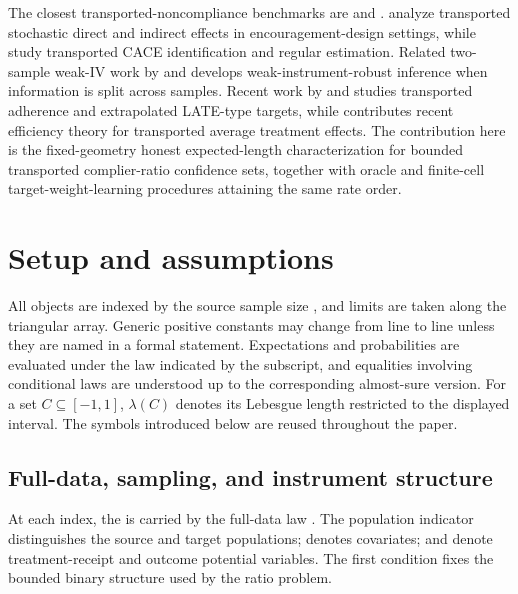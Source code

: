 \documentclass[11pt]{article}
\begin{document}
The closest transported-noncompliance benchmarks are \citet{RudolphVanderLaan2017} and \citet{ChenHuang2025}. \citet{RudolphVanderLaan2017} analyze transported stochastic direct and indirect effects in encouragement-design settings, while \citet{ChenHuang2025} study transported CACE identification and regular estimation. Related two-sample weak-IV work by \citet{ChoiGuShen2018} and \citet{ChoiShen2019} develops weak-instrument-robust inference when information is split across samples. Recent work by \citet{Ross2026} and \citet{Ren2025} studies transported adherence and extrapolated LATE-type targets, while \citet{Rudolph2025} contributes recent efficiency theory for transported average treatment effects. The contribution here is the fixed-geometry honest expected-length characterization for bounded transported complier-ratio confidence sets, together with oracle and finite-cell target-weight-learning procedures attaining the same rate order.


\section{Setup and assumptions}

All objects are indexed by the source sample size , and limits are taken along the triangular array. Generic positive constants may change from line to line unless they are named in a formal statement. Expectations and probabilities are evaluated under the law indicated by the subscript, and equalities involving conditional laws are understood up to the corresponding almost-sure version. For a set \(C\subseteq[-1,1]\), \(\lambda(C)\) denotes its Lebesgue length restricted to the displayed interval. The symbols introduced below are reused throughout the paper.

\subsection{Full-data, sampling, and instrument structure}

At each index, the  is carried by the full-data law . The population indicator  distinguishes the source and target populations;  denotes covariates;  and  denote treatment-receipt and outcome potential variables. The first condition fixes the bounded binary structure used by the ratio problem.
\end{document}
